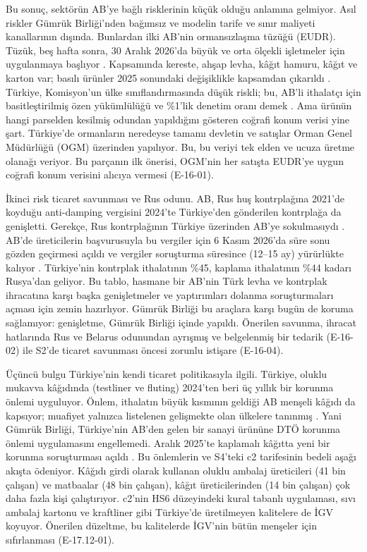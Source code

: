 Bu sonuç, sektörün AB'ye bağlı risklerinin küçük olduğu anlamına gelmiyor. Asıl riskler Gümrük Birliği'nden bağımsız ve modelin tarife ve sınır maliyeti kanallarının dışında. Bunlardan ilki AB'nin ormansızlaşma tüzüğü (EUDR). Tüzük, beş hafta sonra, 30 Aralık 2026'da büyük ve orta ölçekli işletmeler için uygulanmaya başlıyor \etiketV{}. Kapsamında kereste, ahşap levha, kâğıt hamuru, kâğıt ve karton var; basılı ürünler 2025 sonundaki değişiklikle kapsamdan çıkarıldı \etiketV{}. Türkiye, Komisyon'un ülke sınıflandırmasında düşük riskli; bu, AB'li ithalatçı için basitleştirilmiş özen yükümlülüğü ve \%1'lik denetim oranı demek \etiketV{}. Ama ürünün hangi parselden kesilmiş odundan yapıldığını gösteren coğrafi konum verisi yine şart. Türkiye'de ormanların neredeyse tamamı devletin ve satışlar Orman Genel Müdürlüğü (OGM) üzerinden yapılıyor. Bu, bu veriyi tek elden ve ucuza üretme olanağı veriyor. Bu parçanın ilk önerisi, OGM'nin her satışta EUDR'ye uygun coğrafi konum verisini alıcıya vermesi (E-16-01).

İkinci risk ticaret savunması ve Rus odunu. AB, Rus huş kontrplağına 2021'de koyduğu anti-damping vergisini 2024'te Türkiye'den gönderilen kontrplağa da genişletti. Gerekçe, Rus kontrplağının Türkiye üzerinden AB'ye sokulmasıydı \etiketV{}. AB'de üreticilerin başvurusuyla bu vergiler için 6 Kasım 2026'da süre sonu gözden geçirmesi açıldı ve vergiler soruşturma süresince (12--15 ay) yürürlükte kalıyor \etiketV{}. Türkiye'nin kontrplak ithalatının \%45, kaplama ithalatının \%44 kadarı Rusya'dan geliyor. Bu tablo, hasmane bir AB'nin Türk levha ve kontrplak ihracatına karşı başka genişletmeler ve yaptırımları dolanma soruşturmaları açması için zemin hazırlıyor. Gümrük Birliği bu araçlara karşı bugün de koruma sağlamıyor: genişletme, Gümrük Birliği içinde yapıldı. Önerilen savunma, ihracat hatlarında Rus ve Belarus odunundan ayrışmış ve belgelenmiş bir tedarik (E-16-02) ile S2'de ticaret savunması öncesi zorunlu istişare (E-16-04).

Üçüncü bulgu Türkiye'nin kendi ticaret politikasıyla ilgili. Türkiye, oluklu mukavva kâğıdında (testliner ve fluting) 2024'ten beri üç yıllık bir korunma önlemi uyguluyor. Önlem, ithalatın büyük kısmının geldiği AB menşeli kâğıdı da kapsıyor; muafiyet yalnızca listelenen gelişmekte olan ülkelere tanınmış \etiketV{}. Yani Gümrük Birliği, Türkiye'nin AB'den gelen bir sanayi ürününe DTÖ korunma önlemi uygulamasını engellemedi. Aralık 2025'te kaplamalı kâğıtta yeni bir korunma soruşturması açıldı \etiketV{}. Bu önlemlerin ve S4'teki c2 tarifesinin bedeli aşağı akışta ödeniyor. Kâğıdı girdi olarak kullanan oluklu ambalaj üreticileri (41 bin çalışan) ve matbaalar (48 bin çalışan), kâğıt üreticilerinden (14 bin çalışan) çok daha fazla kişi çalıştırıyor. c2'nin HS6 düzeyindeki kural tabanlı uygulaması, sıvı ambalaj kartonu ve kraftliner gibi Türkiye'de üretilmeyen kalitelere de İGV koyuyor. Önerilen düzeltme, bu kalitelerde İGV'nin bütün menşeler için sıfırlanması (E-17.12-01).

